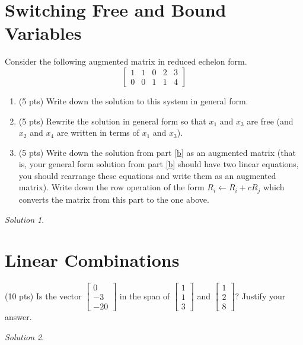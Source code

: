 \documentclass{article}
\theoremstyle{remark}
\newtheorem*{solution}{Solution}
\begin{document}
\pagebreak
\section{Switching Free and Bound Variables}
Consider the following augmented matrix in reduced echelon form.
\begin{displaymath}
  \begin{bmatrix}
    1 & 1 & 0 & 2 & 3 \\
    0 & 0 & 1 & 1 & 4
  \end{bmatrix}
\end{displaymath}
\begin{enumerate}
\item (5 pts) Write down the solution to this system in general form.
\item\label{b} (5 pts) Rewrite the solution in general form so that $x_1$ and $x_3$ are free (and $x_2$ and $x_4$ are written in terms of $x_1$ and $x_3$).
\item\label{c} (5 pts) Write down the solution from part \ref{b} as an augmented matrix (that is, your general form solution from part \ref{b} should have two linear equations, you should rearrange these equations and write them as an augmented matrix).
  Write down the row operation of the form $R_i \gets R_i + cR_j$ which converts the matrix from this part to the one above.
\end{enumerate}

\begin{solution}
\end{solution}

\pagebreak
\section{Linear Combinations}
(10 pts) Is the vector
$
\begin{bmatrix}
  0 \\ -3 \\ -20
\end{bmatrix}
$
in the span of
$
\begin{bmatrix}
  1 \\ 1 \\ 3
\end{bmatrix}
$
and
$
\begin{bmatrix}
  1 \\ 2 \\ 8
\end{bmatrix}?
$
Justify your answer.

\begin{solution}
\end{solution}
\end{document}
